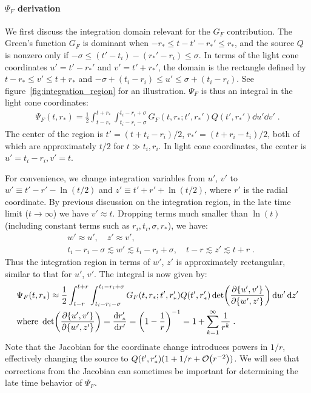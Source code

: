 \documentclass[reprint,aps,physrev,superscriptaddress,10pt,notitlepage,prd,nofootinbib,onecolumn]{revtex4-2}
\newcommand{\fref}[1]{figure~\ref{#1}}
\begin{document}
\paragraph{$\Psi_F$ derivation}
We first discuss the integration domain relevant for the $G_F$ contribution.
The Green's function $G_F$ is dominant when $-r_* \leq t-t'-r_*' \leq r_*$, and the source $Q$ is nonzero only if $-\sigma \leq (t'-t_i)-(r_*'-r_i) \leq \sigma$.
In terms of the light cone coordinates $u' = t'-r_*'$ and $v' = t' + r_*'$, the domain is the rectangle defined by $t - r_* \leq v' \leq t + r_*$ and $-\sigma + (t_i-r_i) \leq u' \leq \sigma + (t_i-r_i)$.
See \fref{fig:integration_region} for an illustration.
$\Psi_F$ is thus an integral in the light cone coordinates:
\begin{align}
  \Psi_F(t,r_*)
  =  \frac12 \int_{t-r_*}^{t+r_*} \int_{t_i-r_i-\sigma}^{t_i-r_i+\sigma} G_F(t,r_*; t', r_*') Q(t',r_*') \dd{u'} \dd{v'} \;.
\end{align}
The center of the region is $t' = (t+t_i-r_i)/2$, $r_*' = (t+r_i-t_i)/2$, both of which are approximately $t/2$ for $t \gg t_i, r_i$.
In light cone coordinates, the center is $u' = t_i-r_i, v' = t$.


For convenience, we change integration variables from $u'$, $v'$ to $w' \equiv t'-r' - \ln(t/2)$ and $z' \equiv t'+r' + \ln(t/2)$, where $r'$ is the radial coordinate.
By previous discussion on the integration region, in the late time limit ($t \to \infty$) we have $v' \approx t$.
Dropping terms much smaller than $\ln(t)$ (including constant terms such as $r_i,t_i,\sigma,r_*$), we have:
\begin{align}
  & w' \approx u',\quad z' \approx v', \nonumber \\
    & t_i-r_i-\sigma \lesssim w' \lesssim t_i-r_i+\sigma  , \quad
      t-r  \lesssim z' \lesssim t+r  \;.
\end{align}
Thus the integration region in terms of $w'$, $z'$ is approximately rectangular, similar to that for $u'$, $v'$.
The integral is now given by:
\begin{align}
  \label{eq:Psi_F_determinant_factor}
  & \Psi_F(t,r_*)
  \approx  \frac12 \int_{t-r}^{t+r} \int_{t_i-r_i-\sigma}^{t_i-r_i+\sigma} G_F(t,r_*; t', r_*') Q(t',r_*') \det(\pdv{\{u',v'\}}{\{w',z'\}}) \dd{w'} \dd{z'} \nonumber \\
  &\textrm{where } \det(\pdv{\{u',v'\}}{\{w',z'\}}) = \dv{r_*'}{r'} = \left(1 - \frac{1}{r}\right)^{-1} = 1 + \sum_{k=1}^\infty \frac{1}{r^k} \;.
\end{align}
Note that the Jacobian for the coordinate change introduces powers in $1/r$, effectively changing the source to $Q(t',r_*') (1 + 1/r + \order{r^{-2}})$.
We will see that corrections from the Jacobian can sometimes be important for determining the late time behavior of $\Psi_F$.
\end{document}
